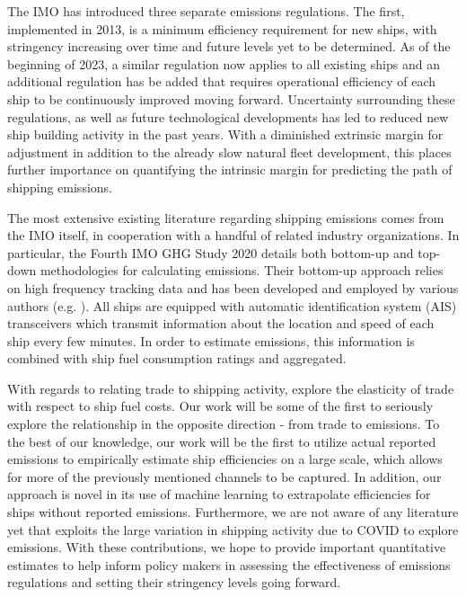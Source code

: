 \documentclass[hidelinks, 12pt,letterpaper]{article}
\begin{document}
The IMO has introduced three separate emissions regulations. The first, implemented in 2013, is a minimum efficiency requirement for new ships, with stringency increasing over time and future levels yet to be determined. As of the beginning of 2023, a similar regulation now applies to all existing ships and an additional regulation has be added that requires operational efficiency of each ship to be continuously improved moving forward. Uncertainty surrounding these regulations, as well as future technological developments has led to reduced new ship building activity in the past years. With a diminished extrinsic margin for adjustment in addition to the already slow natural fleet development, this places further importance on quantifying the intrinsic margin for predicting the path of shipping emissions.

The most extensive existing literature regarding shipping emissions comes from the IMO itself, in cooperation with a handful of related industry organizations. In particular, the Fourth IMO GHG Study 2020 \citep{faber2020fourth} details both bottom-up and top-down methodologies for calculating emissions. Their bottom-up approach relies on high frequency tracking data and has been developed and employed by various authors (e.g. \citet{olmer2017greenhouse, johansson2017global, jalkanen2009modelling, van2018spatially}). All ships are equipped with automatic identification system (AIS) transceivers which transmit information about the location and speed of each ship every few minutes. In order to estimate emissions, this information is combined with ship fuel consumption ratings and aggregated.

With regards to relating trade to shipping activity, \citet{brancaccio2018impact} explore the elasticity of trade with respect to ship fuel costs. Our work will be some of the first to seriously explore the relationship in the opposite direction - from trade to emissions. To the best of our knowledge, our work will be the first to utilize actual reported emissions to empirically estimate ship efficiencies on a large scale, which allows for more of the previously mentioned channels to be captured. In addition, our approach is novel in its use of machine learning to extrapolate efficiencies for ships without reported emissions. Furthermore, we are not aware of any literature yet that exploits the large variation in shipping activity due to COVID to explore emissions. With these contributions, we hope to provide important quantitative estimates to help inform policy makers in assessing the effectiveness of emissions regulations and setting their stringency levels going forward.
\end{document}
